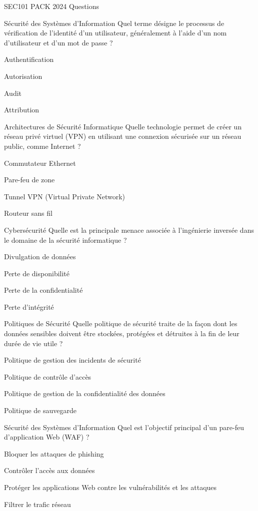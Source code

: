 \documentclass[12pt]{article}
\begin{document}
\begin{quiz}{SEC101 PACK 2024 Questions}
  \begin{multi}[points=1]{Sécurité des Systèmes d'Information}
    Quel terme désigne le processus de vérification de l'identité d'un utilisateur, généralement à l'aide d'un nom d'utilisateur et d'un mot de passe ?
    \item* Authentification
    \item Autorisation
    \item Audit
    \item Attribution
  \end{multi}

  \begin{multi}[points=1]{Architectures de Sécurité Informatique}
    Quelle technologie permet de créer un réseau privé virtuel (VPN) en utilisant une connexion sécurisée sur un réseau public, comme Internet ?
    \item Commutateur Ethernet
    \item Pare-feu de zone
    \item* Tunnel VPN (Virtual Private Network)
    \item Routeur sans fil
  \end{multi}

  \begin{multi}[points=1]{Cybersécurité}
    Quelle est la principale menace associée à l'ingénierie inversée dans le domaine de la sécurité informatique ?
    \item Divulgation de données
    \item Perte de disponibilité
    \item* Perte de la confidentialité
    \item Perte d'intégrité
  \end{multi}

  \begin{multi}[points=1]{Politiques de Sécurité}
    Quelle politique de sécurité traite de la façon dont les données sensibles doivent être stockées, protégées et détruites à la fin de leur durée de vie utile ?
    \item Politique de gestion des incidents de sécurité
    \item Politique de contrôle d'accès
    \item* Politique de gestion de la confidentialité des données
    \item Politique de sauvegarde
  \end{multi}

  \begin{multi}[points=1]{Sécurité des Systèmes d'Information}
    Quel est l'objectif principal d'un pare-feu d'application Web (WAF) ?
    \item Bloquer les attaques de phishing
    \item Contrôler l'accès aux données
    \item* Protéger les applications Web contre les vulnérabilités et les attaques
    \item Filtrer le trafic réseau
  \end{multi}


\end{quiz}
\end{document}
